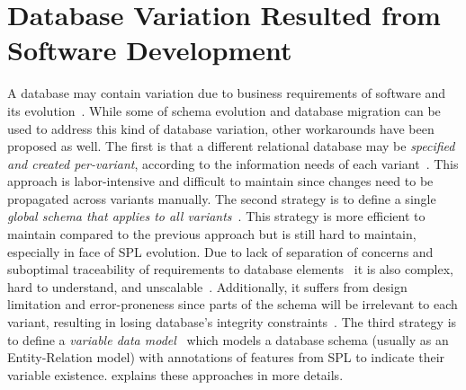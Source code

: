 \section{Database Variation Resulted from Software Development}
\label{sec:varsoft}

A database may contain variation due to business requirements of software
and its evolution~\cite{dbDecay16Stonebraker, dbSPLevolve}. 
While some of schema evolution and database migration can be used to 
address this kind of database variation, other workarounds have been
proposed as well.
%
%
The first is that a different relational database may be \emph{specified and
created per-variant}, according to the information needs of each
variant~\cite{marco13featureAdaptSch}. 
This approach is labor-intensive and difficult to maintain
since changes need to be propagated across variants manually.
%
The second strategy is to define a single \emph{global schema that applies
to all variants}~\cite{batini86dbSchIntegAnalysis}. 
This strategy is more efficient to maintain compared to the previous approach
but is still hard to maintain,
especially in face of SPL evolution. Due to lack of separation of concerns
and suboptimal traceability of requirements to database elements~\cite{skrhas09DBIS}
it is also complex, hard to understand, and unscalable~\cite{slrs12CAiSE}. 
Additionally, it suffers from design limitation and 
error-proneness since parts of the schema will be irrelevant to each variant,
resulting in losing database's integrity constraints~\cite{slrs12CAiSE}.
%
The third strategy is to define a \emph{variable data model}~\cite{skrhas09DBIS, 
slrs12CAiSE, ad11varDataModel} which models a database schema 
(usually as an Entity-Relation model) with
annotations of features from SPL to indicate their variable existence. 
 explains these approaches in more details. 



